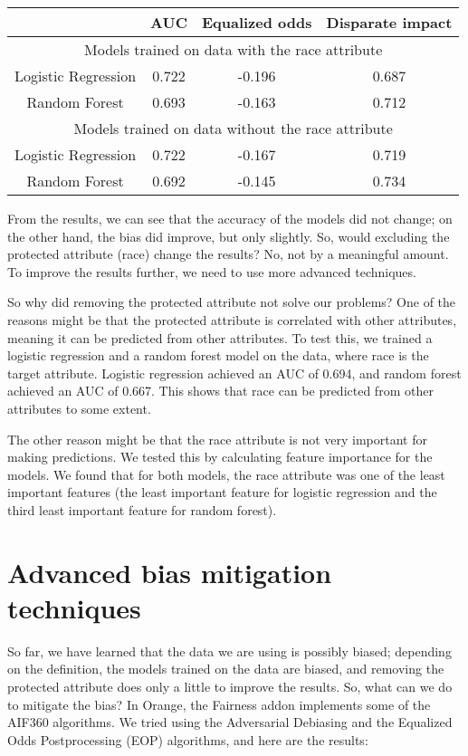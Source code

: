 \documentclass[sigconf,nonacm]{acmart}
\begin{document}
\begin{table}[h]
 \centering
 \begin{tabular}{|c|c|c|c|}
 \hline
 & AUC & Equalized odds & Disparate impact \\
 \hline
 \multicolumn{4}{|c|}{Models trained on data with the race attribute} \\
 \hline
 Logistic
 Regression
 & 0.722 & -0.196 & 0.687 \\
 Random
 Forest
 & 0.693 & -0.163 & 0.712 \\
 \hline
 \multicolumn{4}{|c|}{Models trained on data without the race attribute} \\
 \hline
 Logistic
 Regression
 & 0.722 & -0.167 & 0.719 \\
 Random
 Forest
 & 0.692 & -0.145 & 0.734 \\
 \hline
 \end{tabular}
 \label{tab:my_label}
\end{table}

From the results, we can see that the accuracy of the models did not change; on the other hand, the bias did improve, but only slightly. So, would excluding the protected attribute (race) change the results? No, not by a meaningful amount. To improve the results further, we need to use more advanced techniques.

So why did removing the protected attribute not solve our problems? One of the reasons might be that the protected attribute is correlated with other attributes, meaning it can be predicted from other attributes. To test this, we trained a logistic regression and a random forest model on the data, where race is the target attribute. Logistic regression achieved an AUC of 0.694, and random forest achieved an AUC of 0.667. This shows that race can be predicted from other attributes to some extent.

The other reason might be that the race attribute is not very important for making predictions. We tested this by calculating feature importance for the models. We found that for both models, the race attribute was one of the least important features (the least important feature for logistic regression and the third least important feature for random forest).

\section{Advanced bias mitigation techniques}
So far, we have learned that the data we are using is possibly biased; depending on the definition, the models trained on the data are biased, and removing the protected attribute does only a little to improve the results. So, what can we do to mitigate the bias? In Orange, the Fairness addon implements some of the AIF360 \cite{bellamy2019ai} algorithms.
We tried using the Adversarial Debiasing and the Equalized Odds Postprocessing (EOP) algorithms, and here are the results:
\end{document}
